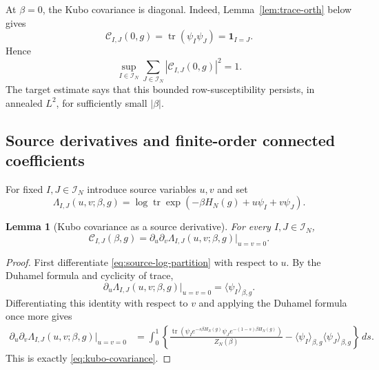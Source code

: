 \documentclass[11pt]{article}
\newtheorem{lemma}[theorem]{Lemma}
\newcommand{\tr}{\operatorname{tr}}
\newcommand{\calI}{\mathcal{I}}
\newcommand{\dd}{\,d}
\newcommand{\ind}{\mathbf{1}}
\begin{document}
At $\beta=0$, the Kubo covariance is diagonal.  Indeed,
Lemma~\ref{lem:trace-orth} below gives
\begin{equation}\label{eq:kubo-beta-zero}
  \mathcal C_{I,J}(0,g)
  =
  \tr(\psi_I\psi_J)
  =
  \ind_{I=J}.
\end{equation}
Hence
\begin{equation}\label{eq:kubo-beta-zero-sum}
  \sup_{I\in\calI_N}
  \sum_{J\in\calI_N}
  \left|\mathcal C_{I,J}(0,g)\right|^2
  =
  1.
\end{equation}
The target estimate says that this bounded row-susceptibility persists, in
annealed $L^2$, for sufficiently small $|\beta|$.

\subsection{Source derivatives and finite-order connected coefficients}

For fixed $I,J\in\calI_N$ introduce source variables $u,v$ and set
\begin{equation}\label{eq:source-log-partition}
  \Lambda_{I,J}(u,v;\beta,g)
  =
  \log\tr\exp\left(-\beta H_N(g)+u\psi_I+v\psi_J\right).
\end{equation}

\begin{lemma}[Kubo covariance as a source derivative]
  \label{lem:kubo-source-derivative}
  For every $I,J\in\calI_N$,
  \begin{equation}\label{eq:kubo-source-derivative}
    \mathcal C_{I,J}(\beta,g)
    =
    \partial_u\partial_v\Lambda_{I,J}(u,v;\beta,g)\big|_{u=v=0}.
  \end{equation}
\end{lemma}

\begin{proof}
  First differentiate \eqref{eq:source-log-partition} with respect to $u$.
  By the Duhamel formula and cyclicity of trace,
  \begin{equation}\label{eq:first-source-derivative}
    \partial_u\Lambda_{I,J}(u,v;\beta,g)\big|_{u=v=0}
    =
    \langle\psi_I\rangle_{\beta,g}.
  \end{equation}
  Differentiating this identity with respect to $v$ and applying the Duhamel
  formula once more gives
  \begin{align}\label{eq:second-source-derivative-proof}
    \partial_u\partial_v\Lambda_{I,J}(u,v;\beta,g)\big|_{u=v=0}
    &=
    \int_0^1
    \left\{
      \frac{
        \tr\left(\psi_I e^{-s\beta H_N(g)}
        \psi_J e^{-(1-s)\beta H_N(g)}\right)
      }{Z_N(\beta)}
      -
      \langle\psi_I\rangle_{\beta,g}
      \langle\psi_J\rangle_{\beta,g}
    \right\}
    \dd s.
  \end{align}
  This is exactly \eqref{eq:kubo-covariance}.
\end{proof}
\end{document}
